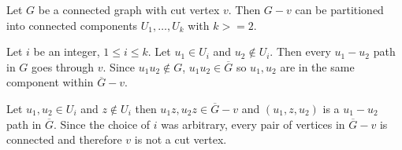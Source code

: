 Let $G$ be a connected graph with cut vertex $v$. Then $G-v$ can be partitioned into connected
components $U_1, \ldots , U_k$ with $k >= 2$.

Let $i$ be an integer, $1\le i \le k $. Let $u_1 \in U_i$ and $u_2 \notin U_i$. Then every $u_1 - u_2$ path in $G$ goes through $v$. Since
$u_1u_2 \notin G$, $u_1u_2 \in \overline{G}$ so $u_1, u_2$ are in the same component within $\overline{G}-v$.

Let $u_1, u_2 \in U_i$ and $z \notin U_i$ then $u_1z, u_2z \in \overline{G}-v$ and $(u_1, z, u_2)$ is
a $u_1 - u_2$ path in $\overline{G}$. Since the choice of $i$ was arbitrary, every pair of vertices 
in $\overline{G}-v$ is connected and therefore $v$ is not a cut vertex.

